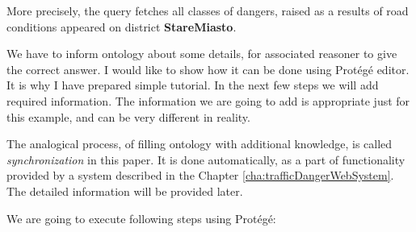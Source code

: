 \noindent More precisely, the query fetches all classes of dangers, raised as a results of road conditions appeared on district \textbf{StareMiasto}.

We have to inform ontology about some details, for associated reasoner to give the correct answer. I would like to show how it can be done using Protégé editor. It is why I have prepared simple tutorial. In the next few steps we will add required information. The information we are going to add is appropriate just for this example, and can be very different in reality.

\begin{framed}
\noindent The analogical process, of filling ontology with additional knowledge, is called \textit{synchronization} in this paper. It is done automatically, as a part of functionality provided by a system described in the Chapter \ref{cha:trafficDangerWebSystem}. The detailed information will be provided later.
\end{framed}

\noindent We are going to execute following steps using Protégé:

